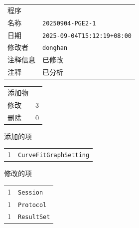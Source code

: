 \documentclass[UTF8,10pt,a4paper,fontset=fandol]{ctexart}
\newcommand{\fieldvalue}[1]{#1}
\begin{document}
\begin{tabular}{@{}ll@{}}
程序 & \\[-1pt]
\quad 名称 &
\fieldvalue{\texttt{20250904-PGE2-1}} \\[2pt]
\quad 日期 &
\fieldvalue{\texttt{2025-09-04T15:12:19+08:00}} \\[2pt]
\quad 修改者 &
\fieldvalue{\texttt{donghan}} \\[2pt]
\quad 注释信息 &
\fieldvalue{已修改} \\[2pt]
\quad 注释 &
\fieldvalue{已分析} \\
\end{tabular}

\vspace{0.5em}

\begin{tabular}{@{}ll@{}}
添加物 & \\[-1pt]
\quad 修改 &
\fieldvalue{3} \\[2pt]
\quad 删除 &
\fieldvalue{0} \\
\end{tabular}

\vspace{0.5em}

添加的项

\begin{tabular}{@{}ll@{}}
1 &
\fieldvalue{\texttt{CurveFitGraphSetting}} \\
\end{tabular}

\vspace{0.5em}

修改的项

\begin{tabular}{@{}ll@{}}
1 &
\fieldvalue{\texttt{Session}} \\[2pt]
1 &
\fieldvalue{\texttt{Protocol}} \\[2pt]
1 &
\fieldvalue{\texttt{ResultSet}} \\
\end{tabular}
\end{document}
